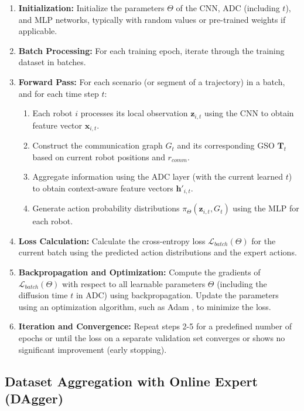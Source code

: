 \begin{enumerate}
    \item \textbf{Initialization:} Initialize the parameters $\Theta$ of the CNN, ADC (including $t$), and MLP networks, typically with random values or pre-trained weights if applicable.
    \item \textbf{Batch Processing:} For each training epoch, iterate through the training dataset in batches.
    \item \textbf{Forward Pass:} For each scenario (or segment of a trajectory) in a batch, and for each time step $t$:
        \begin{enumerate}
            \item Each robot $i$ processes its local observation $\mathbf{z}_{i,t}$ using the CNN to obtain feature vector $\mathbf{x}_{i,t}$.
            \item Construct the communication graph $G_t$ and its corresponding GSO $\mathbf{T}_t$ based on current robot positions and $r_{comm}$.
            \item Aggregate information using the ADC layer (with the current learned $t$) to obtain context-aware feature vectors $\mathbf{h}'_{i,t}$.
            \item Generate action probability distributions $\pi_{\Theta}(\mathbf{z}_{i,t}, G_t)$ using the MLP for each robot.
        \end{enumerate}
    \item \textbf{Loss Calculation:} Calculate the cross-entropy loss $\mathcal{L}_{batch}(\Theta)$ for the current batch using the predicted action distributions and the expert actions.
    \item \textbf{Backpropagation and Optimization:} Compute the gradients of $\mathcal{L}_{batch}(\Theta)$ with respect to all learnable parameters $\Theta$ (including the diffusion time $t$ in ADC) using backpropagation. Update the parameters using an optimization algorithm, such as Adam \cite{Kingma2014Adam}, to minimize the loss.
    \item \textbf{Iteration and Convergence:} Repeat steps 2-5 for a predefined number of epochs or until the loss on a separate validation set converges or shows no significant improvement (early stopping).
\end{enumerate}

\subsection{Dataset Aggregation with Online Expert (DAgger)}

